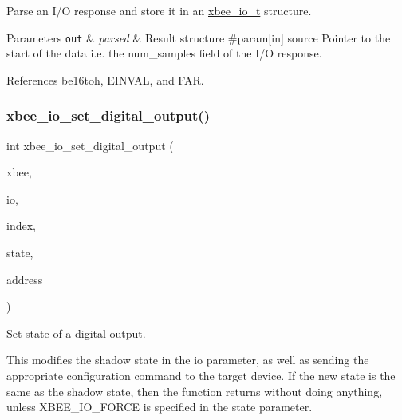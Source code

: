 Parse an I/O response and store it in an \hyperlink{structxbee__io__t}{xbee\+\_\+io\+\_\+t} structure. 


\begin{DoxyParams}[1]{Parameters}
\mbox{\tt out}  & {\em parsed} & Result structure \#param\mbox{[}in\mbox{]} source Pointer to the start of the data i.\+e. the num\+\_\+samples field of the I/O response. \\
\hline
\end{DoxyParams}


References be16toh, E\+I\+N\+V\+AL, and F\+AR.

\mbox{\label{group__xbee__io_ga73696df85c4f9e52d5d24825d3a90b2a}} 
\subsubsection{\texorpdfstring{xbee\+\_\+io\+\_\+set\+\_\+digital\+\_\+output()}{xbee\_io\_set\_digital\_output()}}
{\footnotesize\ttfamily int xbee\+\_\+io\+\_\+set\+\_\+digital\+\_\+output (\begin{DoxyParamCaption}\item[{\hyperlink{structxbee__dev__t}{xbee\+\_\+dev\+\_\+t} $\ast$}]{xbee,  }\item[{\hyperlink{structxbee__io__t}{xbee\+\_\+io\+\_\+t} \hyperlink{group__hal_gaef060b3456fdcc093a7210a762d5f2ed}{F\+AR} $\ast$}]{io,  }\item[{uint\+\_\+fast8\+\_\+t}]{index,  }\item[{enum \hyperlink{group__xbee__io_gaf104a10d2bc34550b99de92fe3564cd2}{xbee\+\_\+io\+\_\+digital\+\_\+output\+\_\+state}}]{state,  }\item[{const \hyperlink{structwpan__address__t}{wpan\+\_\+address\+\_\+t} \hyperlink{group__hal_gaef060b3456fdcc093a7210a762d5f2ed}{F\+AR} $\ast$}]{address }\end{DoxyParamCaption})}



Set state of a digital output. 

This modifies the shadow state in the io parameter, as well as sending the appropriate configuration command to the target device. If the new state is the same as the shadow state, then the function returns without doing anything, unless X\+B\+E\+E\+\_\+\+I\+O\+\_\+\+F\+O\+R\+CE is specified in the state parameter.


